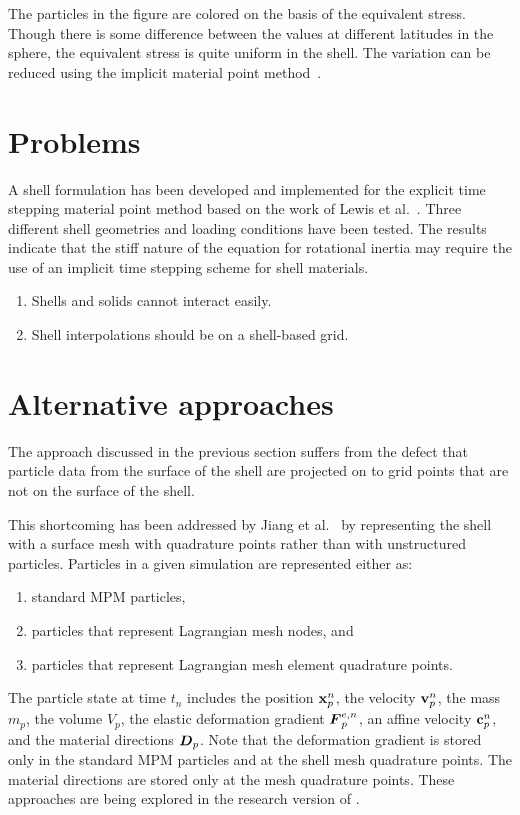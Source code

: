     The particles in the figure are colored on the basis of the equivalent
    stress.  Though there is some difference between the values at different
    latitudes in the sphere, the equivalent stress is quite uniform in the
    shell.  The variation can be reduced using the implicit material point 
    method~\cite{Guilkey2003}.

  \section{Problems}
  A shell formulation has been developed and implemented for the explicit 
  time stepping material point method based on the work of 
  Lewis et al.~\cite{Lewis1998}.  Three different shell geometries and loading 
  conditions have been tested.  The results indicate that the stiff nature
  of the equation for rotational inertia may require the use of an implicit
  time stepping scheme for shell materials.

  \begin{enumerate}
    \item  Shells and solids cannot interact easily.
    \item  Shell interpolations should be on a shell-based grid.
  \end{enumerate}

  \section{Alternative approaches}
  The approach discussed in the previous section suffers from the defect that 
  particle data from the surface of the shell are projected on to grid points
  that are not on the surface of the shell.

  This shortcoming has been addressed by Jiang et al.~\cite{Jiang2017} by
  representing the shell with a surface mesh with quadrature points rather 
  than with unstructured particles.  Particles in a given simulation are
  represented either as:
  \begin{enumerate}
    \item standard MPM particles,
    \item particles that represent Lagrangian mesh nodes, and
    \item particles that represent Lagrangian mesh element quadrature points.
  \end{enumerate}

  The particle state at time $t_n$ includes the position $\mathbf{x}_p^n$, the velocity
  $\mathbf{v}_p^n$, the mass $m_p$, the volume $V_p$, the elastic deformation gradient 
  $\boldsymbol{F}_p^{e,n}$, an affine velocity $\mathbf{c}_p^n$, and the material directions $\boldsymbol{D}_p$.
  Note that the deformation gradient is stored only in the standard MPM particles
  and at the shell mesh quadrature points.  The material directions are stored
  only at the mesh quadrature points.  These approaches are being explored in
  the research version of \Vaango.

  
